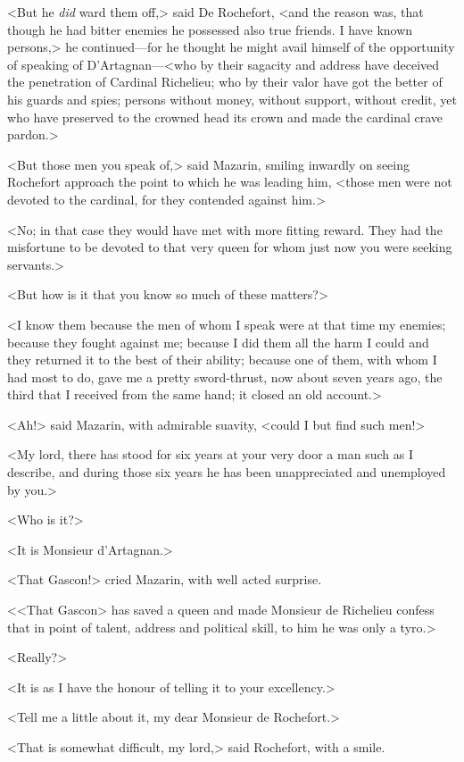 <But he \textit{did} ward them off,> said De Rochefort, <and the reason was, that though he had bitter enemies he possessed also true friends. I have known persons,> he continued—for he thought he might avail himself of the opportunity of speaking of D'Artagnan—<who by their sagacity and address have deceived the penetration of Cardinal Richelieu; who by their valor have got the better of his guards and spies; persons without money, without support, without credit, yet who have preserved to the crowned head its crown and made the cardinal crave pardon.>

<But those men you speak of,> said Mazarin, smiling inwardly on seeing Rochefort approach the point to which he was leading him, <those men were not devoted to the cardinal, for they contended against him.>

<No; in that case they would have met with more fitting reward. They had the misfortune to be devoted to that very queen for whom just now you were seeking servants.>

<But how is it that you know so much of these matters?>

<I know them because the men of whom I speak were at that time my enemies; because they fought against me; because I did them all the harm I could and they returned it to the best of their ability; because one of them, with whom I had most to do, gave me a pretty sword-thrust, now about seven years ago, the third that I received from the same hand; it closed an old account.>

<Ah!> said Mazarin, with admirable suavity, <could I but find such men!>

<My lord, there has stood for six years at your very door a man such as I describe, and during those six years he has been unappreciated and unemployed by you.>

<Who is it?>

<It is Monsieur d'Artagnan.>

<That Gascon!> cried Mazarin, with well acted surprise.

<<That Gascon> has saved a queen and made Monsieur de Richelieu confess that in point of talent, address and political skill, to him he was only a tyro.>

<Really?>

<It is as I have the honour of telling it to your excellency.>

<Tell me a little about it, my dear Monsieur de Rochefort.>

<That is somewhat difficult, my lord,> said Rochefort, with a smile.

